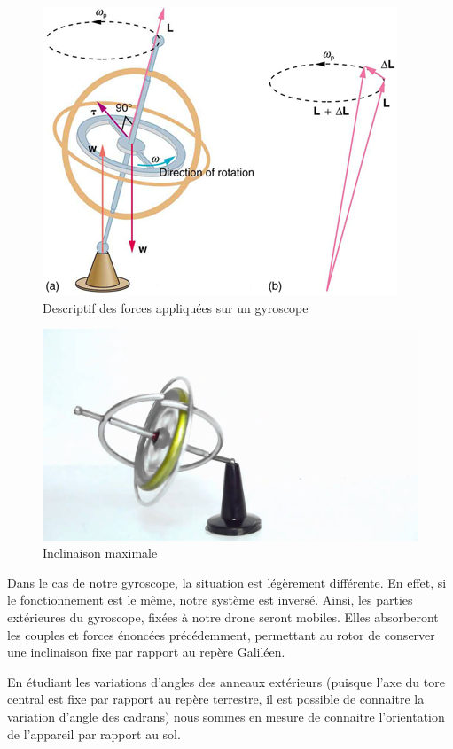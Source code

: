 \documentclass[a4paper,10pt]{report}
\begin{document}
	  \begin{figure}[htbp]
	    \centering
	    \includegraphics[scale = 1.3]{img/schema_gyro.png}
	    \caption{Descriptif des forces appliquées sur un gyroscope}
	    \label{descriptifforces}
	  \end{figure}
	  
	  \begin{figure}[htbp]
	    \centering
	    \includegraphics[scale = 0.2]{img/inclinaison.jpg}
	    \caption{Inclinaison maximale}
	    \label{inclinaisonmax}
	  \end{figure}
	  
	  Dans le cas de notre gyroscope, la situation est légèrement 
différente. En effet, si le fonctionnement est le même, notre système est 
inversé. Ainsi, les parties extérieures du gyroscope, fixées à notre drone 
seront mobiles. Elles absorberont les couples et forces énoncées précédemment, 
permettant au rotor de conserver une inclinaison fixe par rapport au repère 
Galiléen.

	  En étudiant les variations d'angles des anneaux extérieurs (puisque 
l'axe du tore central est fixe par rapport au repère terrestre, il est possible 
de connaitre la variation d'angle des cadrans) nous sommes en mesure de 
connaitre l'orientation de l'appareil par rapport au sol.
\end{document}
